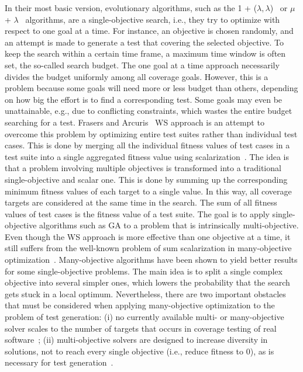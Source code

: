 \documentclass{article}
\begin{document}
In their most basic version, evolutionary algorithms, such as the 1 + ($\lambda,\lambda$)~\cite{Doerr2015} or $\mu$ + $\lambda$~\cite{TerSarkisov2011} algorithms, are a single-objective search, i.e., they try to optimize with respect to one goal at a time. For instance, an objective is chosen randomly, and an attempt is made to generate a test that covering the selected objective. To keep the search within a certain time frame, a maximum time window is often set, the so-called search budget. The one goal at a time approach necessarily divides the budget uniformly among all coverage goals. However, this is a problem because some goals will need more or less budget than others, depending on how big the effort is to find a corresponding test. Some goals may even be unattainable, e.g., due to conflicting constraints, which wastes the entire budget searching for a test. Frasers and Arcuris~\cite{Fraser_2013} \ac{WS} approach is an attempt to overcome this problem by optimizing entire test suites rather than individual test cases. This is done by merging all the individual fitness values of test cases in a test suite into a single aggregated fitness value using scalarization~\cite{Deb2014}. The idea is that a problem involving multiple objectives is transformed into a traditional single-objective and scalar one. This is done by summing up the corresponding minimum fitness values of each target to a single value. In this way, all coverage targets are considered at the same time in the search. The sum of all fitness values of test cases is the fitness value of a test suite. The goal is to apply single-objective algorithms such as \ac{GA} to a problem that is intrinsically multi-objective. Even though the \ac{WS} approach is more effective than one objective at a time, it still suffers from the well-known problem of sum scalarization in many-objective optimization~\cite{Deb2014}. Many-objective algorithms have been shown to yield better results for some single-objective problems. The main idea is to split a single complex objective into several simpler ones, which lowers the probability that the search gets stuck in a local optimum. Nevertheless, there are two important obstacles that must be considered when applying many-objective optimization to the problem of test generation: (i) no currently available multi- or many-objective solver scales to the number of targets that occurs in coverage testing of real software~\cite{Arcuri_2014}; (ii) multi-objective solvers are designed to increase diversity in solutions, not to reach every single objective (i.e., reduce fitness to 0), as is necessary for test generation~\cite{Panichella2018}. 
\end{document}
